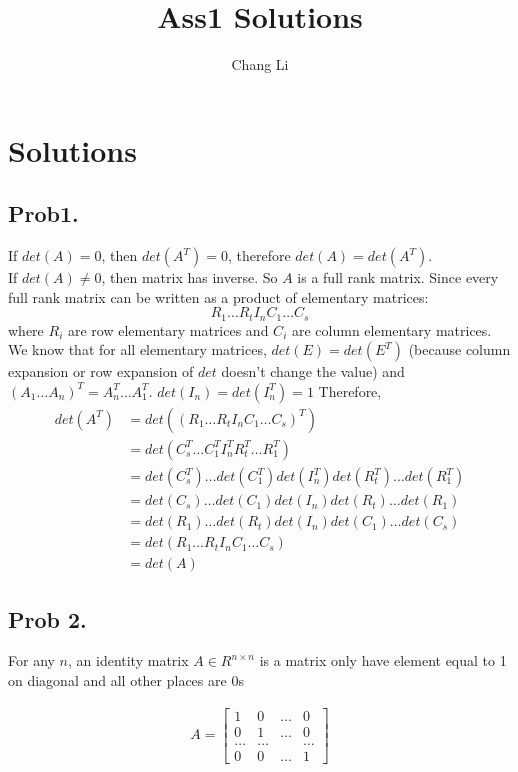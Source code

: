 \documentclass[10pt,a4paper]{article}
\begin{document}
\title{Ass1 Solutions}
\author{Chang Li}
\maketitle

\section{Solutions}

\subsection{Prob1.}
If $det(A) = 0$, then $det(A^T) = 0$, therefore $det(A) = det(A^T)$.\\
If $det(A) \neq 0$, then matrix has inverse. So $A$ is a full rank matrix. Since every full rank matrix can be written as a product of elementary matrices:
$$
R_1\dots R_tI_nC_1\dots C_s
$$
where $R_i$ are row elementary matrices and $C_i$ are column elementary matrices. We know that for all elementary matrices, $det(E) = det(E^T)$ (because column expansion or row expansion of $det$ doesn't change the value) and $(A_1\dots A_n)^T = A_n^T\dots A_1^T$. $det(I_n) = det(I_n^T) = 1$ Therefore, 
\begin{align*}
	det(A^T) &= det((R_1\dots R_tI_nC_1\dots C_s)^T)\\
	&= det(C_s^T\dots C_1^T I_n^T R_t^T\dots R_1^T) \\
	&= det(C_s^T)\dots det(C_1^T) det(I_n^T) det(R_t^T)\dots det(R_1^T) \\
	&= det(C_s)\dots det(C_1) det(I_n) det(R_t)\dots det(R_1) \\
	&= det(R_1)\dots det(R_t) det(I_n) det(C_1) \dots det(C_s) \\
	&= det(R_1\dots R_tI_nC_1\dots C_s) \\
	&= det(A)
\end{align*}

\subsection{Prob 2.}
For any $n$, an identity matrix $A\in R^{n\times n}$ is a matrix only have element equal to 1 on diagonal and all other places are 0s

\begin{align*}
A = \left[ \begin{matrix}
1 & 0 & \dots & 0 \\
0 & 1 & \dots & 0 \\
\dots & \dots & &\dots\\
0 & 0 & \dots & 1
\end{matrix} \right]
\end{align*}
\end{document}
